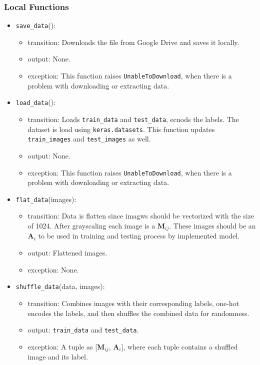 \documentclass[12pt, titlepage]{article}
\def\code#1{\texttt{#1}}
\begin{document}
\subsubsection{Local Functions}
\begin{itemize}
  \item \code{save\_data}():
  \begin{itemize}
    \item transition: Downloads the file from Google Drive and saves it locally.
    \item output: None.
    \item exception: This function raises \code{UnableToDownload}, when there is 
    a problem with downloading or extracting data.
  \end{itemize}

  \item \code{load\_data}():
  \begin{itemize}
    \item transition: Loads \code{train\_data} and \code{test\_data}, ecnods the labels. 
    The dataset is load using \code{keras.datasets}.
    This function updates \code{train\_images} and \code{test\_images} as well. 
    \item output: None.
    \item exception: This function raises \code{UnableToDownload}, when there is 
    a problem with downloading or extracting data.
  \end{itemize}

  \item \code{flat\_data}(images):
  \begin{itemize}
    \item transition: Data is flatten since imagws should be vectorized with the size of 1024. 
    After grayscaling each image is a $\mathbf{M}_{ij}$. These images should be an $\mathbf{A}_{i}$ to be used in 
    training and testing process by implemented model.
    \item output: Flattened images.
    \item exception: None.
  \end{itemize}

  \item \code{shuffle\_data}(data, images):
  \begin{itemize}
    \item transition: Combines images with their corresponding labels, one-hot encodes the labels, 
    and then shuffles the combined data for randomness.
    \item output: \code{train\_data} and \code{test\_data}.
    \item exception: A tuple as [$\mathbf{M}_{ij}$, $\mathbf{A}_{i}$], 
    where each tuple contains a shuffled image and its label.
  \end{itemize}

\end{itemize}
\end{document}
